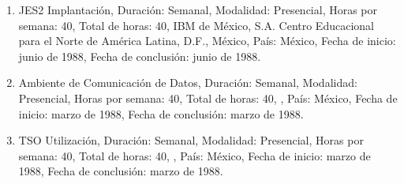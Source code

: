 \begin{enumerate}
\item JES2 Implantación, Duración: Semanal, Modalidad: Presencial, Horas por semana: 40, Total de horas: 40, IBM de México, 
S.A. Centro Educacional para el Norte de América Latina, D.F., México, País: México, Fecha de inicio: junio de 1988, Fecha 
de conclusión: junio de 1988.

\item Ambiente de Comunicación de Datos, Duración: Semanal, Modalidad: Presencial, Horas por semana: 40, Total de horas: 
40, 
, País: México, Fecha de inicio: marzo de 1988, Fecha de conclusión: marzo de 1988.

\item TSO Utilización, Duración: Semanal, Modalidad: Presencial, Horas por semana: 40, Total de horas: 40, , País: México, 
Fecha de inicio: marzo de 1988, Fecha de conclusión: marzo de 1988.

\end{enumerate}
